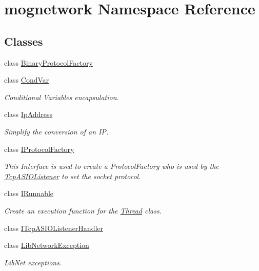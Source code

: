 \hypertarget{namespacemognetwork}{\section{mognetwork Namespace Reference}
\label{namespacemognetwork}
}
\subsection*{Classes}
\begin{DoxyCompactItemize}
\item 
class \hyperlink{classmognetwork_1_1_binary_protocol_factory}{Binary\-Protocol\-Factory}
\item 
class \hyperlink{classmognetwork_1_1_cond_var}{Cond\-Var}
\begin{DoxyCompactList}\small\item\em Conditional Variables encapsulation. \end{DoxyCompactList}\item 
class \hyperlink{classmognetwork_1_1_ip_address}{Ip\-Address}
\begin{DoxyCompactList}\small\item\em Simplify the conversion of an I\-P. \end{DoxyCompactList}\item 
class \hyperlink{classmognetwork_1_1_i_protocol_factory}{I\-Protocol\-Factory}
\begin{DoxyCompactList}\small\item\em This Interface is used to create a Protocol\-Factory who is used by the \hyperlink{classmognetwork_1_1_tcp_a_s_i_o_listener}{Tcp\-A\-S\-I\-O\-Listener} to set the socket protocol. \end{DoxyCompactList}\item 
class \hyperlink{classmognetwork_1_1_i_runnable}{I\-Runnable}
\begin{DoxyCompactList}\small\item\em Create an execution function for the \hyperlink{classmognetwork_1_1_thread}{Thread} class. \end{DoxyCompactList}\item 
class \hyperlink{classmognetwork_1_1_i_tcp_a_s_i_o_listener_handler}{I\-Tcp\-A\-S\-I\-O\-Listener\-Handler}
\item 
class \hyperlink{classmognetwork_1_1_lib_network_exception}{Lib\-Network\-Exception}
\begin{DoxyCompactList}\small\item\em Lib\-Net exceptions. \end{DoxyCompactList}\item 

\end{DoxyCompactItemize}
